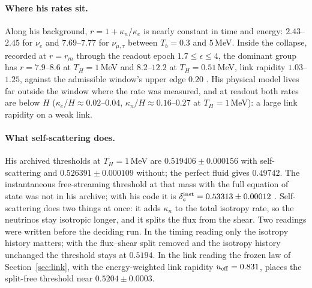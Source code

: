 \paragraph{Where his rates sit.} Along his background, $r=1+\kappa_n/\kappa_e$ is nearly constant in time and energy: $2.43$--$2.45$ for $\nu_e$ and $7.69$--$7.77$ for $\nu_{\mu,\tau}$ between $T_b=0.3$ and $5$\,MeV. Inside the collapse, recorded at $r=r_m$ through the readout epoch $1.7\le\epsilon\le4$, the dominant group has $r=7.9$--$8.6$ at $T_H=1$\,MeV and $8.2$--$12.2$ at $T_H=0.51$\,MeV, link rapidity $1.03$--$1.25$, against the admissible window's upper edge $0.20$ . His physical model lives far outside the window where the rate was measured, and at readout both rates are below $H$ ($\kappa_e/H\approx0.02$--$0.04$, $\kappa_n/H\approx0.16$--$0.27$ at $T_H=1$\,MeV): a large link rapidity on a weak link.

\paragraph{What self-scattering does.} His archived thresholds at $T_H=1$\,MeV are $0.519406\pm0.000156$ with self-scattering and $0.526391\pm0.000109$ without; the perfect fluid gives $0.49742$. The instantaneous free-streaming threshold at that mass with the full equation of state was not in his archive; with his code it is $\delta_c^{\rm inst}=0.53313\pm0.00012$ . Self-scattering does two things at once: it adds $\kappa_n$ to the total isotropy rate, so the neutrinos stay isotropic longer, and it splits the flux from the shear. Two readings were written before the deciding run. In the timing reading only the isotropy history matters; with the flux--shear split removed and the isotropy history unchanged the threshold stays at $0.5194$. In the link reading the frozen law of Section~\ref{sec:link}, with the energy-weighted link rapidity $u_{\rm eff}=0.831$, places the split-free threshold near $0.5204\pm0.0003$.

